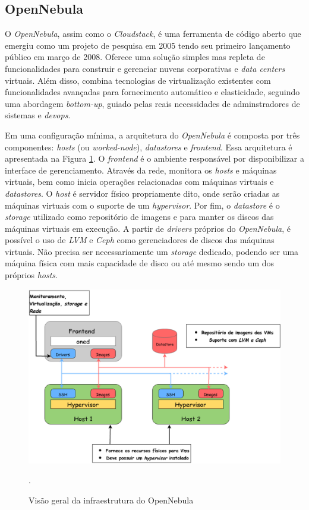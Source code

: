 \subsection{OpenNebula}
O \textit{OpenNebula}, assim como o \textit{Cloudstack}, é uma ferramenta de código aberto que emergiu como um projeto de pesquisa em 2005 tendo seu primeiro lançamento público em março de 2008. Oferece uma solução simples mas repleta de funcionalidades para construir e gerenciar nuvens corporativas e \textit{data centers} virtuais. Além disso, combina tecnologias de virtualização existentes com funcionalidades avançadas para fornecimento automático e elasticidade, seguindo uma abordagem \textit{bottom-up}, guiado pelas reais necessidades de adminstradores de sistemas e \textit{devops}\cite{opennebula}.

Em uma configuração mínima, a arquitetura do \textit{OpenNebula} é composta por três componentes: \textit{hosts} (ou \textit{worked-node}), \textit{datastores} e \textit{frontend}. Essa arquitetura é apresentada na Figura \ref{diagramaopennebula}. O \textit{frontend} é o ambiente responsável por disponibilizar a interface de gerenciamento. Através da rede, monitora os \textit{hosts} e máquinas virtuais, bem como inicia operações relacionadas com máquinas virtuais e \textit{datastores}. O \textit{host} é servidor físico propriamente dito, onde serão criadas as máquinas virtuais com o suporte de um \textit{hypervisor}. Por fim, o \textit{datastore} é o \textit{storage} utilizado como repositório de imagens e para manter os discos das máquinas virtuais em execução. A partir de \textit{drivers} próprios do \textit{OpenNebula}, é possível o uso de \textit{LVM} e \textit{Ceph} como gerenciadores de discos das máquinas virtuais. Não precisa ser necessariamente um \textit{storage} dedicado, podendo ser uma máquina física com mais capacidade de disco ou até mesmo sendo um dos próprios \textit{hosts}.  

\begin{figure}[!htb]
\centering
\includegraphics [keepaspectratio=true,scale=0.5]{figuras/opennebula_struct.eps}
\caption{Visão geral da infraestrutura do OpenNebula}
\cite{opennebula}.
\label{diagramaopennebula}
\end{figure}

